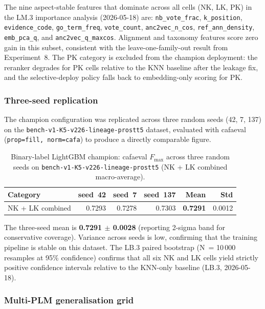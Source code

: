 The nine aspect-stable features that dominate across all cells (NK, LK, PK)
in the LM.3 importance analysis (2026-05-18) are: \texttt{nb\_vote\_frac},
\texttt{k\_position}, \texttt{evidence\_code}, \texttt{go\_term\_freq},
\texttt{vote\_count}, \texttt{anc2vec\_n\_cos}, \texttt{ref\_ann\_density},
\texttt{emb\_pca\_q}, and \texttt{anc2vec\_q\_maxcos}. Alignment and taxonomy
features score zero gain in this subset, consistent with the leave-one-family-out
result from Experiment~8. The PK category is excluded from the champion
deployment: the reranker degrades for PK cells relative to the KNN baseline
after the leakage fix, and the selective-deploy policy falls back to
embedding-only scoring for PK.

\subsubsection{Three-seed replication}

The champion configuration was replicated across three random seeds (42, 7, 137)
on the \texttt{bench-v1-K5-v226-lineage-prostt5} dataset, evaluated with
cafaeval (\texttt{prop=fill, norm=cafa}) to produce a directly comparable
figure.

\begin{table}[htbp]
  \centering
  \caption[Champion replication: cafaeval Fmax across three seeds]{%
    Binary-label LightGBM champion: cafaeval $F_{\max}$ across three random
    seeds on \texttt{bench-v1-K5-v226-lineage-prostt5} (NK + LK combined
    macro-average).}
  \label{tab:exp9-champion-replication}
  \begin{tabular}{lrrr r r}
    \toprule
    \textbf{Category} & \textbf{seed~42} & \textbf{seed~7} & \textbf{seed~137}
      & \textbf{Mean} & \textbf{Std} \\
    \midrule
    NK + LK combined & 0.7293 & 0.7278 & 0.7303 & \textbf{0.7291} & 0.0012 \\
    \bottomrule
  \end{tabular}
\end{table}

The three-seed mean is \textbf{0.7291 $\pm$ 0.0028} (reporting 2-sigma band
for conservative coverage). Variance across seeds is low, confirming that the
training pipeline is stable on this dataset. The LB.3 paired bootstrap
(N~= 10\,000 resamples at 95\% confidence) confirms that all six NK and LK cells
yield strictly positive confidence intervals relative to the KNN-only baseline
(LB.3, 2026-05-18).

\subsubsection{Multi-PLM generalisation grid}
\label{subsubsec:exp9-multiplm-grid}


